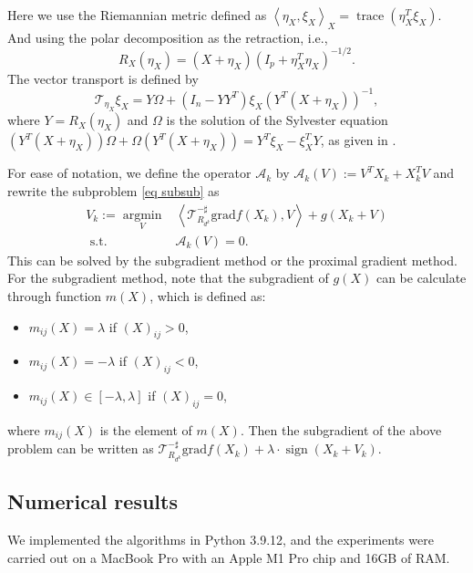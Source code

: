 \documentclass[pdflatex,sn-mathphys-num]{sn-jnl}%
\theoremstyle{definition} %
\theoremstyle{remark} %
\newcommand{\grad}{\mathrm{grad}}
\begin{document}
Here we use the Riemannian metric defined as
$
\left\langle\eta_X, \xi_X\right\rangle_X=\operatorname{trace}(\eta_X^T \xi_X).
$
And using the polar decomposition as the retraction, i.e.,
$$
R_X\left(\eta_X\right)=\left(X+\eta_X\right)\left(I_p+\eta_X^T \eta_X\right)^{-1 / 2}.
$$
The vector transport is defined by
$$
\mathcal{T}_{\eta_X} \xi_X=Y \Omega+\left(I_n-Y Y^T\right) \xi_X\left(Y^T\left(X+\eta_X\right)\right)^{-1},
$$
where $Y=R_X\left(\eta_X\right)$ and $\Omega$ is the solution of the Sylvester equation 
$\left(Y^T\left(X+\eta_X\right)\right) \Omega+\Omega\left(Y^T(X+\eta_X)\right)=Y^T \xi_X-\xi_X^T Y
$, as given in \cite[Lemma 10.2.1]{huang2013optimization}.

For ease of notation, we define the operator $\mathcal{A}_k$ by $\mathcal{A}_k(V):=V^T X_k+X_k^T V$ and rewrite the subproblem \eqref{eq subsub} as
$$
\begin{aligned}
V_k:=\underset{V}{\operatorname{argmin}} & \left\langle \mathcal{T}_{R_{d^k}}^{-\sharp}\grad f\left(X_k\right), V\right\rangle+g\left(X_k+V\right) \\
\text { s.t. } & \mathcal{A}_k(V)=0 .
\end{aligned}
$$
This can be solved by the subgradient method or the proximal gradient method.
For the subgradient method, note that the subgradient of \( g(X) \) can be calculate through function $m(X)$, which is defined as:
\begin{itemize}[-]
\item \( m_{ij}(X) = \lambda \) if \( (X)_{ij} > 0 \),
\item \( m_{ij}(X) = -\lambda \) if \( (X)_{ij} < 0 \),
\item \( m_{ij}(X) \in [-\lambda, \lambda] \) if \( (X)_{ij} = 0 \),
\end{itemize}
where $m_{ij}(X)$ is the element of $m(X)$.
Then the subgradient of the above problem can be written as
$
\mathcal{T}_{R_{d^k}}^{-\sharp} \grad f(X_k) + \lambda \cdot \operatorname{sign}(X_k + V_k).
$


\subsection{Numerical results}
We implemented the algorithms in Python 3.9.12, and the experiments were carried out on a MacBook Pro with an Apple M1 Pro chip and 16GB of RAM.
\end{document}

